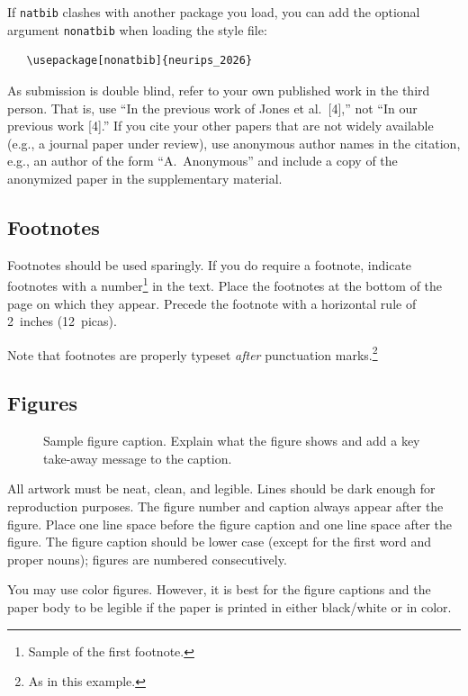 \documentclass{article}
\begin{document}
If \verb+natbib+ clashes with another package you load, you can add the optional
argument \verb+nonatbib+ when loading the style file:
\begin{verbatim}
   \usepackage[nonatbib]{neurips_2026}
\end{verbatim}


As submission is double blind, refer to your own published work in the third
person. That is, use ``In the previous work of Jones et al.\ [4],'' not ``In our
previous work [4].'' If you cite your other papers that are not widely available
(e.g., a journal paper under review), use anonymous author names in the
citation, e.g., an author of the form ``A.\ Anonymous'' and include a copy of the anonymized paper in the supplementary material.


\subsection{Footnotes}


Footnotes should be used sparingly.  If you do require a footnote, indicate
footnotes with a number\footnote{Sample of the first footnote.} in the
text. Place the footnotes at the bottom of the page on which they appear.
Precede the footnote with a horizontal rule of 2~inches (12~picas).


Note that footnotes are properly typeset \emph{after} punctuation
marks.\footnote{As in this example.}


\subsection{Figures}


\begin{figure}[H]
  \centering
  \fbox{\rule[-.5cm]{0cm}{4cm} \rule[-.5cm]{4cm}{0cm}}
  \caption{Sample figure caption. Explain what the figure shows and add a key take-away message to the caption.}
\end{figure}


All artwork must be neat, clean, and legible. Lines should be dark enough for
 reproduction purposes. The figure number and caption always appear after the
figure. Place one line space before the figure caption and one line space after
the figure. The figure caption should be lower case (except for the first word and proper nouns); figures are numbered consecutively.


You may use color figures.  However, it is best for the figure captions and the
paper body to be legible if the paper is printed in either black/white or in
color.
\end{document}
